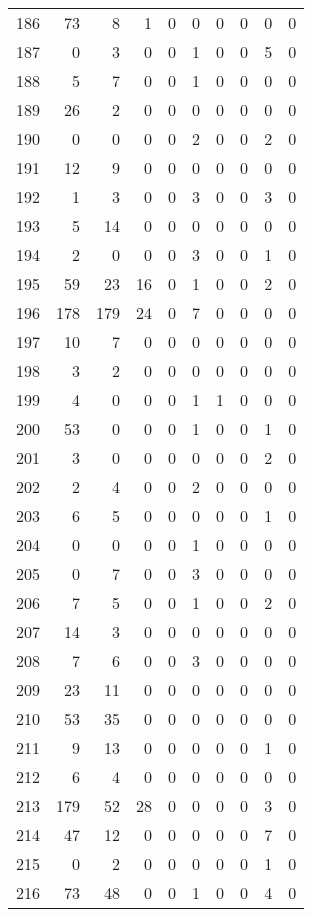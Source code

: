 \begin{tabular}{lrrrrrrrrr}
186 & 73 & 8 & 1 & 0 & 0 & 0 & 0 & 0 & 0 \\
187 & 0 & 3 & 0 & 0 & 1 & 0 & 0 & 5 & 0 \\
188 & 5 & 7 & 0 & 0 & 1 & 0 & 0 & 0 & 0 \\
189 & 26 & 2 & 0 & 0 & 0 & 0 & 0 & 0 & 0 \\
190 & 0 & 0 & 0 & 0 & 2 & 0 & 0 & 2 & 0 \\
191 & 12 & 9 & 0 & 0 & 0 & 0 & 0 & 0 & 0 \\
192 & 1 & 3 & 0 & 0 & 3 & 0 & 0 & 3 & 0 \\
193 & 5 & 14 & 0 & 0 & 0 & 0 & 0 & 0 & 0 \\
194 & 2 & 0 & 0 & 0 & 3 & 0 & 0 & 1 & 0 \\
195 & 59 & 23 & 16 & 0 & 1 & 0 & 0 & 2 & 0 \\
196 & 178 & 179 & 24 & 0 & 7 & 0 & 0 & 0 & 0 \\
197 & 10 & 7 & 0 & 0 & 0 & 0 & 0 & 0 & 0 \\
198 & 3 & 2 & 0 & 0 & 0 & 0 & 0 & 0 & 0 \\
199 & 4 & 0 & 0 & 0 & 1 & 1 & 0 & 0 & 0 \\
200 & 53 & 0 & 0 & 0 & 1 & 0 & 0 & 1 & 0 \\
201 & 3 & 0 & 0 & 0 & 0 & 0 & 0 & 2 & 0 \\
202 & 2 & 4 & 0 & 0 & 2 & 0 & 0 & 0 & 0 \\
203 & 6 & 5 & 0 & 0 & 0 & 0 & 0 & 1 & 0 \\
204 & 0 & 0 & 0 & 0 & 1 & 0 & 0 & 0 & 0 \\
205 & 0 & 7 & 0 & 0 & 3 & 0 & 0 & 0 & 0 \\
206 & 7 & 5 & 0 & 0 & 1 & 0 & 0 & 2 & 0 \\
207 & 14 & 3 & 0 & 0 & 0 & 0 & 0 & 0 & 0 \\
208 & 7 & 6 & 0 & 0 & 3 & 0 & 0 & 0 & 0 \\
209 & 23 & 11 & 0 & 0 & 0 & 0 & 0 & 0 & 0 \\
210 & 53 & 35 & 0 & 0 & 0 & 0 & 0 & 0 & 0 \\
211 & 9 & 13 & 0 & 0 & 0 & 0 & 0 & 1 & 0 \\
212 & 6 & 4 & 0 & 0 & 0 & 0 & 0 & 0 & 0 \\
213 & 179 & 52 & 28 & 0 & 0 & 0 & 0 & 3 & 0 \\
214 & 47 & 12 & 0 & 0 & 0 & 0 & 0 & 7 & 0 \\
215 & 0 & 2 & 0 & 0 & 0 & 0 & 0 & 1 & 0 \\
216 & 73 & 48 & 0 & 0 & 1 & 0 & 0 & 4 & 0 \\
\bottomrule
\end{tabular}
